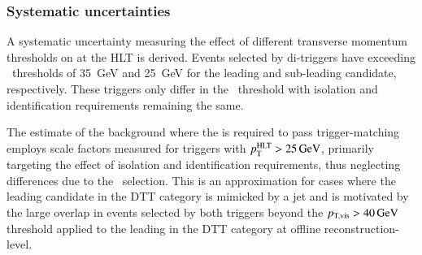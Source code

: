 

\subsubsection{Systematic uncertainties}


A systematic uncertainty measuring the effect of different transverse
momentum thresholds on \tauhadvis at the HLT is derived.  Events
selected by di-\tauhadvis triggers have \tauhadvis exceeding
\pTHLT~thresholds of \SI{35}{\GeV} and \SI{25}{\GeV} for the leading
and sub-leading candidate, respectively. These triggers only differ in
the \pTHLT~threshold with isolation and identification requirements
remaining the same.

The estimate of the \ttbarFakes background where the \faketauhadvis is
required to pass trigger-matching employs scale factors measured for
triggers with $p_{\text{T}}^{\text{HLT}} > \SI{25}{\ensuremath{\text{GeV}}}$, primarily targeting the effect
of isolation and identification requirements, thus neglecting
differences due to the \pTHLT~selection. This is an approximation for
cases where the leading \tauhadvis candidate in the DTT category is
mimicked by a jet and is motivated by the large overlap in events
selected by both triggers beyond the $\pTvis > \SI{40}{\GeV}$
threshold applied to the leading \tauhadvis in the DTT category at
offline reconstruction-level.

